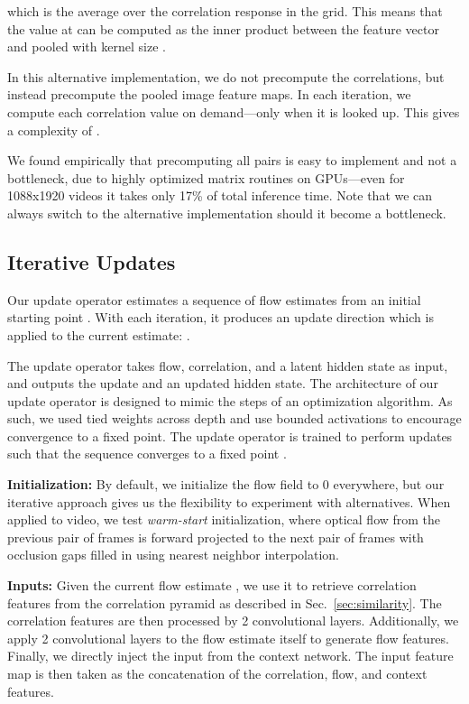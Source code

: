 \documentclass[runningheads]{llncs}
\begin{document}
which is the average over the correlation response in the  grid. This means that the value at  can be computed as the inner product between the feature vector  and  pooled with kernel size .

In this alternative implementation, we do not precompute the correlations, but instead precompute the pooled image feature maps. In each iteration, we compute each correlation value on demand---only when it is looked up. This gives a complexity of . 

We found empirically that precomputing all pairs is easy to implement and not a bottleneck, due to highly optimized matrix routines on GPUs---even for 1088x1920 videos it takes only 17\% of total inference time. Note that we can always switch to the alternative implementation should it become a bottleneck. 


\subsection{Iterative Updates}
\label{sec:updates}

Our update operator estimates a sequence of flow estimates  from an initial starting point . With each iteration, it produces an update direction  which is applied to the current estimate: .

The update operator takes flow, correlation, and a latent hidden state as input, and outputs the update  and an updated hidden state. The architecture of our update operator is designed to mimic the steps of an optimization algorithm. As such, we used tied weights across depth and use bounded activations to encourage convergence to a fixed point. The update operator is trained to perform updates such that the sequence converges to a fixed point .

\smallskip \noindent \textbf{Initialization: } By default, we initialize the flow field to 0 everywhere, but our iterative approach gives us the flexibility to experiment with alternatives. When applied to video, we test \emph{warm-start} initialization, where optical flow from the previous pair of frames is forward projected to the next pair of frames with occlusion gaps filled in using nearest neighbor interpolation.

\smallskip \noindent \textbf{Inputs: } Given the current flow estimate , we use it to retrieve correlation features from the correlation pyramid as described in Sec.~\ref{sec:similarity}. The correlation features are then processed by 2 convolutional layers. Additionally, we apply 2 convolutional layers to the flow estimate itself to generate flow features. Finally, we directly inject the input from the context network. The input feature map is then taken as the concatenation of the correlation, flow, and context features. 
\end{document}
